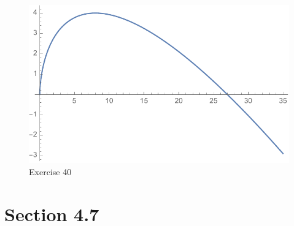 \documentclass[letterpaper, landscape]{exam}
\begin{document}
\begin{description}
      \begin{figure}[H]
        \centering
        \includegraphics[scale = 0.6]{ex40.pdf}
        \caption{Exercise 40}
        \label{fig:ex40}
      \end{figure}

  \end{description}

  \newpage

  \section{Section 4.7} %
\end{document}
